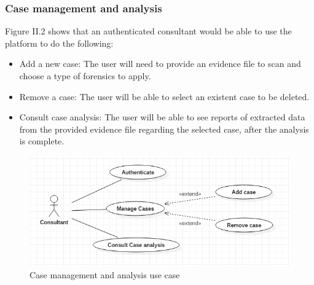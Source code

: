 \subsubsection{Case management and analysis}
Figure II.2 shows that an authenticated consultant would be able to use the platform to do the following:
\begin{itemize}
    \item Add a new case: The user will need to provide an evidence file to scan and choose a type of forensics to apply.
    \item Remove a case: The user will be able to select an existent case to be deleted.
    \item Consult case analysis: The user will be able to see reports of extracted data from the provided evidence file regarding the selected case, after the analysis is complete.
\end{itemize}
\begin{figure}[H]
\centering
\includegraphics[width=1\columnwidth]{Figures/usecase1.png}
\caption{Case management and analysis use case}
\end{figure}

